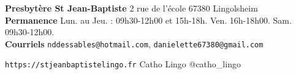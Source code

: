 \begin{framed}
\textbf{Presbytère St Jean-Baptiste}
2 rue de l'école 67380 Lingolsheim  \\
\textbf{Permanence} Lun. au Jeu. : 09h30-12h00 et 15h-18h. Ven. 16h-18h00. Sam. 09h30-12h00. \\
\textbf{Courriels} \texttt{nddessables@hotmail.com}, \texttt{danielette67380@gmail.com}


\texttt{https://stjeanbaptistelingo.fr} \hfill \faFacebook Catho Lingo \hfill \faInstagram @catho\_lingo
\end{framed}

